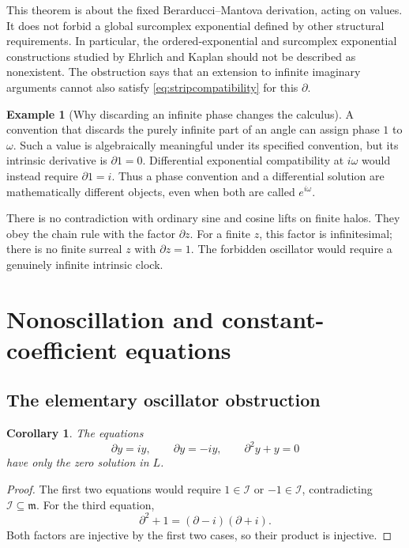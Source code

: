 \documentclass[11pt]{article}
\numberwithin{equation}{section}
\newtheorem{corollary}[theorem]{Corollary}
\theoremstyle{definition}
\newtheorem{example}[theorem]{Example}
\newcommand{\mm}{\mathfrak m}
\newcommand{\II}{\mathcal I}
\newcommand{\DD}{\partial}
\begin{document}
This theorem is about the fixed Berarducci--Mantova derivation, acting on
values. It does not forbid a global surcomplex exponential defined by
other structural requirements. In particular, the ordered-exponential and
surcomplex exponential constructions studied by Ehrlich and Kaplan
\cite{EhrlichKaplan} should not be described as nonexistent. The
obstruction says that an extension to infinite imaginary arguments cannot
also satisfy \eqref{eq:stripcompatibility} for this $\DD$.

\begin{example}[Why discarding an infinite phase changes the calculus]
A convention that discards the purely infinite part of an angle can assign
phase $1$ to $\omega$. Such a value is algebraically meaningful under its
specified convention, but its intrinsic derivative is $\DD 1=0$.
Differential exponential compatibility at $i\omega$ would instead require
$\DD 1=i$. Thus a phase convention and a differential solution are
mathematically different objects, even when both are called
$e^{i\omega}$.
\end{example}

There is no contradiction with ordinary sine and cosine lifts on finite
halos. They obey the chain rule with the factor $\DD z$. For a finite
$z$, this factor is infinitesimal; there is no finite surreal $z$ with
$\DD z=1$. The forbidden oscillator would require a genuinely
infinite intrinsic clock.

\section{Nonoscillation and constant-coefficient equations}
\label{sec:constantODE}

\subsection{The elementary oscillator obstruction}
\begin{corollary}\label{cor:oscillator}
The equations
\[
 \DD y=iy,\qquad \DD y=-iy,\qquad \DD^2y+y=0
\]
have only the zero solution in $L$.
\end{corollary}
\begin{proof}
The first two equations would require $1\in\II$ or $-1\in\II$,
contradicting $\II\subseteq\mm$. For the third equation,
\[
 \DD^2+1=(\DD-i)(\DD+i).
\]
Both factors are injective by the first two cases, so their product is
injective.
\end{proof}
\end{document}
